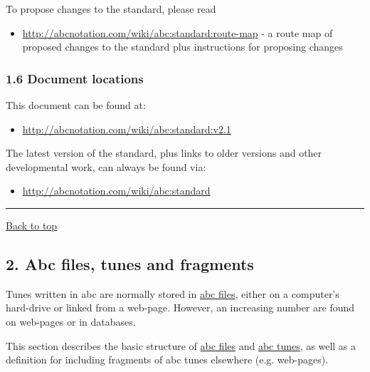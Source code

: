 To propose changes to the standard, please read

\begin{itemize}
\item
  \url{http://abcnotation.com/wiki/abc:standard:route-map} - a route map
  of proposed changes to the standard plus instructions for proposing
  changes
\end{itemize}

\hypertarget{document_locations}{\subsubsection{1.6 Document
locations}\label{document_locations}}

This document can be found at:

\begin{itemize}
\item
  \url{http://abcnotation.com/wiki/abc:standard:v2.1}
\end{itemize}

The latest version of the standard, plus links to older versions and
other developmental work, can always be found via:

\begin{itemize}
\item
  \url{http://abcnotation.com/wiki/abc:standard}
\end{itemize}

\begin{center}\rule{0.5\linewidth}{\linethickness}\end{center}

\protect\hyperlink{}{Back to top}

\hypertarget{abc_files_tunes_and_fragments}{\subsection{2. Abc files,
tunes and fragments}\label{abc_files_tunes_and_fragments}}

Tunes written in abc are normally stored in
\protect\hyperlink{abc_file_definition}{abc files}, either on a
computer's hard-drive or linked from a web-page. However, an increasing
number are found on web-pages or in databases.

This section describes the basic structure of
\protect\hyperlink{abc_file_definition}{abc files} and
\protect\hyperlink{abc_tune_definition}{abc tunes}, as well as a
definition for including fragments of abc tunes elsewhere (e.g.
web-pages).

